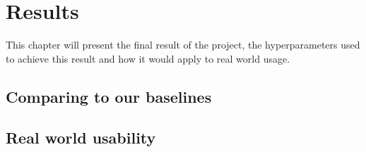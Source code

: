 \chapter{Results}
This chapter will present the final result of the project, the hyperparameters used to achieve this result and how it would apply to real world usage.
\section{Comparing to our baselines}
\section{Real world usability}